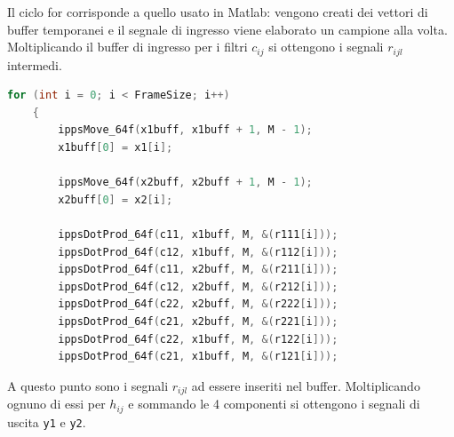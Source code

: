 \documentclass[12pt,a4paper,titlepage]{article}
\begin{document}
Il ciclo for corrisponde a quello usato in Matlab: vengono creati dei vettori di buffer temporanei e il segnale di ingresso viene elaborato un campione alla volta.
Moltiplicando il buffer di ingresso per i filtri $c_{ij}$ si ottengono i segnali $r_{ijl}$ intermedi.
\begin{lstlisting}[language=cpp, label=code:rij, caption = Calcolo dei segnali intermedi, breaklines = false, captionpos = b]
	for (int i = 0; i < FrameSize; i++)
	{
		ippsMove_64f(x1buff, x1buff + 1, M - 1);
		x1buff[0] = x1[i];

		ippsMove_64f(x2buff, x2buff + 1, M - 1);
		x2buff[0] = x2[i];

		ippsDotProd_64f(c11, x1buff, M, &(r111[i]));
		ippsDotProd_64f(c12, x1buff, M, &(r112[i]));
		ippsDotProd_64f(c11, x2buff, M, &(r211[i]));
		ippsDotProd_64f(c12, x2buff, M, &(r212[i]));
		ippsDotProd_64f(c22, x2buff, M, &(r222[i]));
		ippsDotProd_64f(c21, x2buff, M, &(r221[i]));
		ippsDotProd_64f(c22, x1buff, M, &(r122[i]));
		ippsDotProd_64f(c21, x1buff, M, &(r121[i]));
\end{lstlisting}
A questo punto sono i segnali $r_{ijl}$ ad essere inseriti nel buffer. Moltiplicando ognuno di essi per $h_{ij}$ e sommando le 4 componenti si ottengono i segnali di uscita \texttt{y1} e \texttt{y2}.
\end{document}
